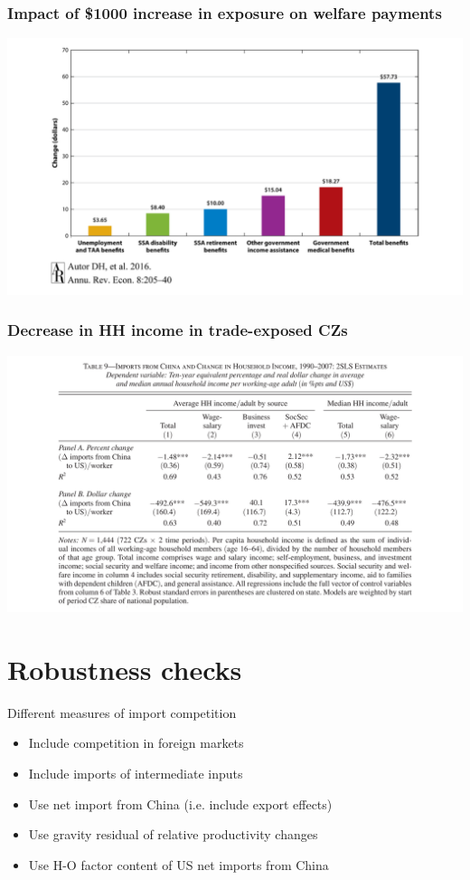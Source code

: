 \documentclass[notes=show]{beamer}
\begin{document}
\begin{frame}
\frametitle{Impact of \$1000 increase in exposure on welfare payments}
\begin{center}
\includegraphics[width=\textwidth]{AR-fig-7.pdf}%
\end{center}
\end{frame}

\begin{frame}
\frametitle{Decrease in HH income in trade-exposed CZs}
\begin{center}
\includegraphics[width=\textwidth]{table-9.pdf}%
\end{center}
\end{frame}

\section{Robustness checks}

\begin{frame}{Different measures of import competition}
\begin{itemize}
    \item Include competition in foreign markets \bigskip
    \item Include imports of intermediate inputs \bigskip
    \item Use net import from China (i.e. include export effects) \bigskip
    \item Use gravity residual of relative productivity changes \bigskip
    \item Use H-O factor content of US net imports from China
\end{itemize}
\end{frame}
\end{document}
